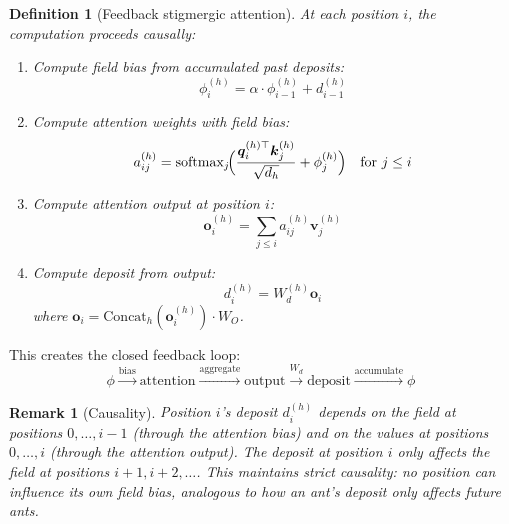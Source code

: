 \documentclass[11pt,a4paper]{article}
\newtheorem{definition}{Definition}
\newtheorem{remark}{Remark}
\newcommand{\retain}{\alpha}
\newcommand{\q}{\bm{q}}
\newcommand{\K}{\bm{k}}
\newcommand{\vv}{\bm{v}}
\begin{document}
\begin{definition}[Feedback stigmergic attention]
\label{def:feedback}
At each position $i$, the computation proceeds causally:
\begin{enumerate}
    \item Compute field bias from accumulated past deposits:
    \begin{equation}
        \phi_i^{(h)} = \retain \cdot \phi_{i-1}^{(h)} + d_{i-1}^{(h)}
    \end{equation}
    \item Compute attention weights with field bias:
    \begin{equation}
        a_{ij}^{(h)} = \text{softmax}_j\!\Bigl(
            \frac{\q_i^{(h)\top} \K_j^{(h)}}{\sqrt{d_h}} + \phi_j^{(h)}
        \Bigr) \quad \text{for } j \leq i
    \end{equation}
    \item Compute attention output at position $i$:
    \begin{equation}
        \bm{o}_i^{(h)} = \sum_{j \leq i} a_{ij}^{(h)} \vv_j^{(h)}
    \end{equation}
    \item Compute deposit from output:
    \begin{equation}
        d_i^{(h)} = W_d^{(h)} \bm{o}_i
        \label{eq:deposit_output}
    \end{equation}
    where $\bm{o}_i = \text{Concat}_h(\bm{o}_i^{(h)}) \cdot W_O$.
\end{enumerate}
\end{definition}

This creates the closed feedback loop:
\begin{equation}
    \phi \xrightarrow{\text{bias}} \text{attention}
    \xrightarrow{\text{aggregate}} \text{output}
    \xrightarrow{W_d} \text{deposit}
    \xrightarrow{\text{accumulate}} \phi
    \label{eq:feedback_loop}
\end{equation}

\begin{remark}[Causality]
\label{rem:causality}
Position $i$'s deposit $d_i^{(h)}$ depends on the field at positions
$0, \ldots, i-1$ (through the attention bias) and on the values at
positions $0, \ldots, i$ (through the attention output). The deposit
at position $i$ only affects the field at positions $i+1, i+2, \ldots$.
This maintains strict causality: no position can influence its own
field bias, analogous to how an ant's deposit only affects future ants.
\end{remark}
\end{document}
